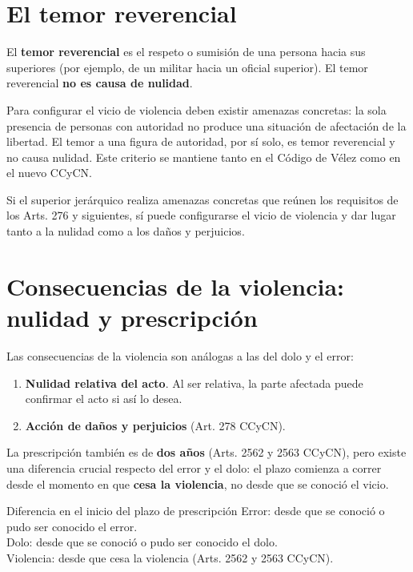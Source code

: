 \documentclass[12pt,oneside]{book}
\begin{document}
\section{El temor reverencial}

El \textbf{temor reverencial} es el respeto o sumisión de una persona hacia sus superiores (por ejemplo, de un militar hacia un oficial superior). El temor reverencial \textbf{no es causa de nulidad}.

Para configurar el vicio de violencia deben existir amenazas concretas: la sola presencia de personas con autoridad no produce una situación de afectación de la libertad. El temor a una figura de autoridad, por sí solo, es temor reverencial y no causa nulidad. Este criterio se mantiene tanto en el Código de Vélez como en el nuevo CCyCN.

\begin{note}
Si el superior jerárquico realiza amenazas concretas que reúnen los requisitos de los Arts. 276 y siguientes, sí puede configurarse el vicio de violencia y dar lugar tanto a la nulidad como a los daños y perjuicios.
\end{note}

\section{Consecuencias de la violencia: nulidad y prescripción}

Las consecuencias de la violencia son análogas a las del dolo y el error:

\begin{enumerate}
    \item \textbf{Nulidad relativa del acto}. Al ser relativa, la parte afectada puede confirmar el acto si así lo desea.
    \item \textbf{Acción de daños y perjuicios} (Art. 278 CCyCN).
\end{enumerate}

La prescripción también es de \textbf{dos años} (Arts. 2562 y 2563 CCyCN), pero existe una diferencia crucial respecto del error y el dolo: el plazo comienza a correr desde el momento en que \textbf{cesa la violencia}, no desde que se conoció el vicio.

\begin{articulo}{Diferencia en el inicio del plazo de prescripción}
Error: desde que se conoció o pudo ser conocido el error.\\
Dolo: desde que se conoció o pudo ser conocido el dolo.\\
Violencia: desde que cesa la violencia (Arts. 2562 y 2563 CCyCN).
\end{articulo}
\end{document}
